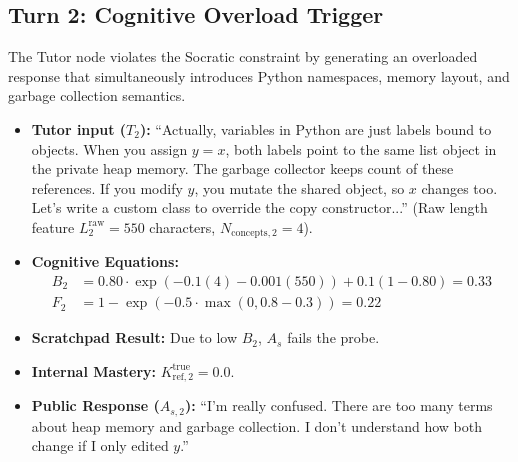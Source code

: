 \documentclass[11pt,a4paper]{report}
\begin{document}
\subsection{Turn 2: Cognitive Overload Trigger}
The Tutor node violates the Socratic constraint by generating an overloaded response that simultaneously introduces Python namespaces, memory layout, and garbage collection semantics.
\begin{itemize}
    \item \textbf{Tutor input ($T_2$):} ``Actually, variables in Python are just labels bound to objects. When you assign $y = x$, both labels point to the same list object in the private heap memory. The garbage collector keeps count of these references. If you modify $y$, you mutate the shared object, so $x$ changes too. Let's write a custom class to override the copy constructor...'' (Raw length feature $L^{\text{raw}}_2 = 550$ characters, $N_{\text{concepts},2} = 4$).
    \item \textbf{Cognitive Equations:}
    \begin{align*}
        B_2 &= 0.80 \cdot \exp\left(-0.1(4) - 0.001(550)\right) + 0.1(1 - 0.80) = 0.33 \\
        F_2 &= 1 - \exp\left(-0.5 \cdot \max(0, 0.8 - 0.3)\right) = 0.22
    \end{align*}
    \item \textbf{Scratchpad Result:} Due to low $B_2$, $A_s$ fails the probe.
    \item \textbf{Internal Mastery:} $K^{\text{true}}_{\text{ref}, 2} = 0.0$.
    \item \textbf{Public Response ($A_{s,2}$):} ``I'm really confused. There are too many terms about heap memory and garbage collection. I don't understand how both change if I only edited $y$.''
\end{itemize}
\end{document}
